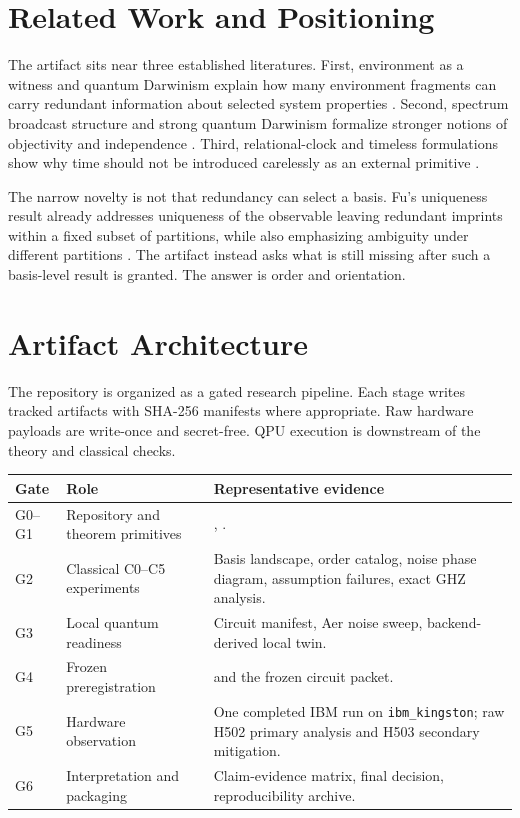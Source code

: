 \documentclass[11pt]{article}
\begin{document}
\section{Related Work and Positioning}

The artifact sits near three established literatures.  First, environment as a
witness and quantum Darwinism explain how many environment fragments can carry
redundant information about selected system properties
\cite{OllivierPoulinZurek2004,BlumeKohoutZurek2006,Zurek2009}.  Second,
spectrum broadcast structure and strong quantum Darwinism formalize stronger
notions of objectivity and independence
\cite{KorbiczHorodeckiHorodecki2014,HorodeckiKorbiczHorodecki2015,LeOlayaCastro2019,Korbicz2021}.
Third, relational-clock and timeless formulations show why time should not be
introduced carelessly as an external primitive \cite{PageWootters1983}.

The narrow novelty is not that redundancy can select a basis.  Fu's uniqueness
result already addresses uniqueness of the observable leaving redundant
imprints within a fixed subset of partitions, while also emphasizing ambiguity
under different partitions \cite{Fu2021}.  The artifact instead asks what is
still missing after such a basis-level result is granted.  The answer is order
and orientation.

\section{Artifact Architecture}

The repository is organized as a gated research pipeline.  Each stage writes
tracked artifacts with SHA-256 manifests where appropriate.  Raw hardware
payloads are write-once and secret-free.  QPU execution is downstream of the
theory and classical checks.

\begin{center}
\begin{tabularx}{\textwidth}{@{}P{0.12\textwidth}P{0.25\textwidth}Y@{}}
\toprule
Gate & Role & Representative evidence \\
\midrule
G0--G1 & Repository and theorem primitives &
,
. \\
G2 & Classical C0--C5 experiments &
Basis landscape, order catalog, noise phase diagram, assumption failures, exact
GHZ analysis. \\
G3 & Local quantum readiness &
Circuit manifest, Aer noise sweep, backend-derived local twin. \\
G4 & Frozen preregistration &
 and the frozen circuit packet. \\
G5 & Hardware observation &
One completed IBM run on \texttt{ibm\_kingston}; raw H502 primary analysis and
H503 secondary mitigation. \\
G6 & Interpretation and packaging &
Claim-evidence matrix, final decision, reproducibility archive. \\
\bottomrule
\end{tabularx}
\end{center}
\end{document}
